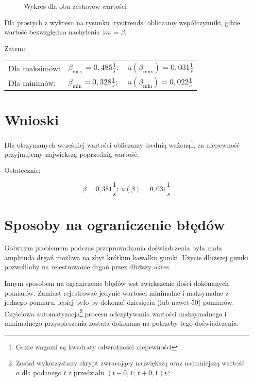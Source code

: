 \documentclass[a4paper,12pt]{article}
\begin{document}
\begin{figure}[h]
	
	\centering
	\caption{Wykres dla obu zestawów wartości}
\end{figure}\label{rys:trends}

Dla prostych z wykresu na rysunku \ref{rys:trends} obliczamy współczynniki, gdzie wartość bezwzględna nachylenia $\left|m\right| = \beta$.

\vspace{5mm}

Zatem:

\vspace{3mm}

\begin{tabular}{lll}
	Dla maksimów:	& $\beta_{\max} = 0,485 \frac{1}{s};$	& $u\left(\beta_{\max}\right) = 0,031 \frac{1}{s}$ \\
	Dla minimów:	& $\beta_{\min} = 0,328\frac{1}{s};$	& $u\left(\beta_{\min}\right) = 0,022\frac{1}{s}$
\end{tabular}

\section{Wnioski}

Dla otrzymanych wcześniej wartości obliczamy średnią ważoną\footnote{Gdzie wagami są kwadraty odwrotności niepewności}, za niepewność przyjmujemy największą poprzednią wartość.

\vspace{5mm}

Ostatecznie:

\[
	\beta = 0,381\frac{1}{s};\: u\left(\beta\right) = 0,031 \frac{1}{s}
\]

\section{Sposoby na ograniczenie błędów}

Głównym problemem podczas przeprowadzania doświadczenia była mała amplituda drgań możliwa na zbyt krótkim kawałku gumki. Użycie dłuższej gumki pozwoliłoby na rejestrowanie drgań przez dłuższy okres.

Innym sposobem na ograniczenie błędów jest zwiększenie ilości dokonanych pomiarów. Zamiast rejestrować jedynie wartości minimalne i maksymalne z jednego pomiaru, lepiej było by dokonać dziesięciu (lub nawet 50) pomiarów. Częściowa automatyzacja\footnote{Został wykorzystany skrypt zwracający największą oraz najmniejszą wartość $a$ dla podanego $t$ z przedziału $\left( t - 0,1;\: t + 0,1 \right)$} procesu odczytywania wartości maksymalnego i minimalnego przyspieszenia została dokonana na potrzeby tego doświadczenia.
\end{document}
